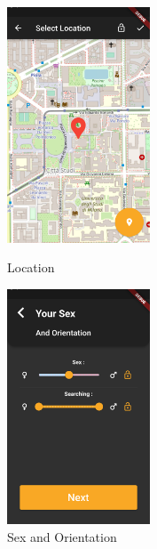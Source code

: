 \documentclass{article}
\begin{document}
\begin{figure}[!htb]
	\centering
	\begin{minipage}{.45\textwidth}
		\centering
		\includegraphics[height=7cm,keepaspectratio]{assets/images/ui/signup/03-map.png}
		\caption{Location}
	\end{minipage}\quad
	\begin{minipage}{.45\textwidth}
		\centering
		\includegraphics[height=7cm,keepaspectratio]{assets/images/ui/signup/04-sex-and-orientation.png}
		\caption{Sex and Orientation}
	\end{minipage}
\end{figure}
\end{document}
